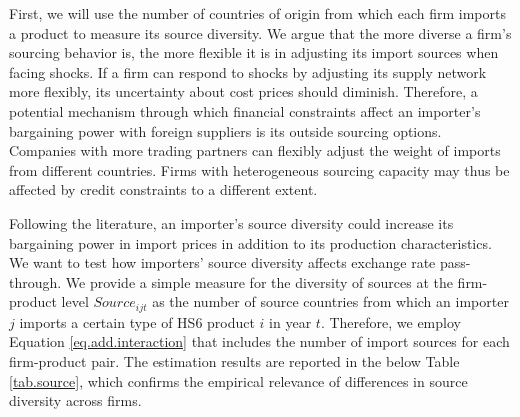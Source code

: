 First, we will use the number of countries of origin from which each firm imports a product to measure its source diversity. We argue that the more diverse a firm's sourcing behavior is, the more flexible it is in adjusting its import sources when facing shocks. If a firm can respond to shocks by adjusting its supply network more flexibly, its uncertainty about cost prices should diminish. Therefore, a potential mechanism through which financial constraints affect an importer's bargaining power with foreign suppliers is its outside sourcing options. Companies with more trading partners can flexibly adjust the weight of imports from different countries. Firms with heterogeneous sourcing capacity may thus be affected by credit constraints to a different extent. 

Following the literature, an importer's source diversity could increase its bargaining power in import prices in addition to its production characteristics. We want to test how importers' source diversity affects exchange rate pass-through. We provide a simple measure for the diversity of sources at the firm-product level $Source_{ijt}$ as the number of source countries from which an importer $j$ imports a certain type of HS6 product $i$ in year $t$. Therefore, we employ Equation \ref{eq.add.interaction} that includes the number of import sources for each firm-product pair. The estimation results are reported in the below Table \ref{tab.source}, which confirms the empirical relevance of differences in source diversity across firms.

